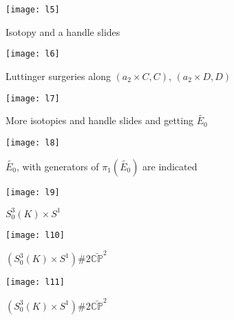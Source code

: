 \documentclass[11pt]{amsart}
\begin{document}
   \begin{figure}[ht]  \begin{center}  
\texttt{[image: l5]}   
\caption{Isotopy and a handle slides} 
\end{center}
\end{figure} 

   \begin{figure}[ht]  \begin{center}  
\texttt{[image: l6]}   
\caption{Luttinger surgeries along $(a_2 \times C, C)$, $( a_2\times D, D)$ } 
\end{center}
\end{figure} 

   \begin{figure}[ht]  \begin{center}  
\texttt{[image: l7]}   
\caption{More isotopies and handle slides and getting $\tilde{E_{0}}$}
\end{center}
\end{figure} 

   \begin{figure}[ht]  \begin{center}  
\texttt{[image: l8]}   
\caption{$\tilde{E_{0}}$, with generators of $\pi_{1} (\tilde{E_{0}})$ are indicated } 
\end{center}
\end{figure} 

   \begin{figure}[ht]  \begin{center}  
\texttt{[image: l9]}   
\caption{$S^{3}_{0}(K) \times S^{1}$}
\end{center}
\end{figure} 

   \begin{figure}[ht]  \begin{center}  
\texttt{[image: l10]}   
\caption{$(S^{3}_{0}(K) \times S^{1} )\# 2\bar{{{\mathbb C}}{{\mathbb P}}}^2$} 
\end{center}
\end{figure} 

   \begin{figure}[ht]  \begin{center}  
\texttt{[image: l11]}   
\caption{$(S^{3}_{0}(K) \times S^{1} )\# 2\bar{{{\mathbb C}}{{\mathbb P}}}^2$} 
\end{center}
\end{figure} 
\end{document}
